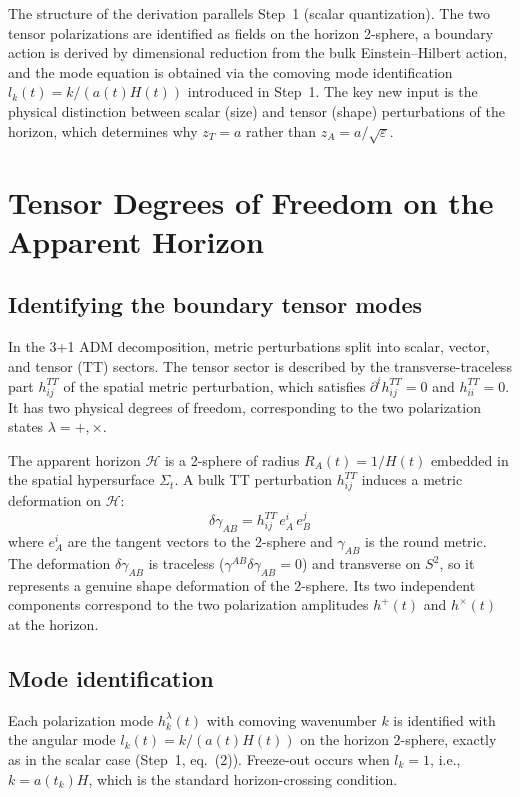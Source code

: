 \documentclass[12pt,a4paper]{article}
\begin{document}
The structure of the derivation parallels Step~1 (scalar quantization). The two tensor polarizations are identified as fields on the horizon 2-sphere, a boundary action is derived by dimensional reduction from the bulk Einstein--Hilbert action, and the mode equation is obtained via the comoving mode identification $l_k(t) = k/(a(t)H(t))$ introduced in Step~1. The key new input is the physical distinction between scalar (size) and tensor (shape) perturbations of the horizon, which determines why $z_T = a$ rather than $z_A = a/\sqrt\varepsilon$.

\section{Tensor Degrees of Freedom on the Apparent Horizon}

\subsection{Identifying the boundary tensor modes}

In the 3+1 ADM decomposition, metric perturbations split into scalar, vector, and tensor (TT) sectors. The tensor sector is described by the transverse-traceless part $h_{ij}^{TT}$ of the spatial metric perturbation, which satisfies $\partial^i h_{ij}^{TT} = 0$ and $h^{TT}_{ii} = 0$. It has two physical degrees of freedom, corresponding to the two polarization states $\lambda = +, \times$.

The apparent horizon $\mathcal{H}$ is a 2-sphere of radius $R_A(t) = 1/H(t)$ embedded in the spatial hypersurface $\Sigma_t$. A bulk TT perturbation $h_{ij}^{TT}$ induces a metric deformation on $\mathcal{H}$:
\begin{equation}
\delta\gamma_{AB} = h_{ij}^{TT}\,e^i_A\,e^j_B \tag{1}
\end{equation}
where $e^i_A$ are the tangent vectors to the 2-sphere and $\gamma_{AB}$ is the round metric. The deformation $\delta\gamma_{AB}$ is traceless ($\gamma^{AB}\delta\gamma_{AB} = 0$) and transverse on $S^2$, so it represents a genuine shape deformation of the 2-sphere. Its two independent components correspond to the two polarization amplitudes $h^+(t)$ and $h^\times(t)$ at the horizon.

\subsection{Mode identification}

Each polarization mode $h_k^\lambda(t)$ with comoving wavenumber $k$ is identified with the angular mode $l_k(t) = k/(a(t)H(t))$ on the horizon 2-sphere, exactly as in the scalar case (Step~1, eq.~(2)). Freeze-out occurs when $l_k = 1$, i.e., $k = a(t_k)H$, which is the standard horizon-crossing condition.
\end{document}
